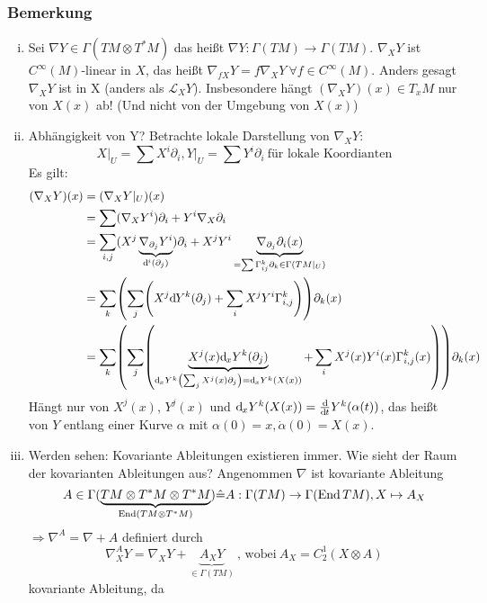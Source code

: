 \subsubsection{Bemerkung}
\label{ssub:29}
\begin{enumerate}[(i)]
\item Sei $\nabla Y\in\Gamma(TM\otimes T^* M)$ das heißt $\nabla Y: \Gamma(TM)\to \Gamma(TM)$. $\nabla_X Y$ ist $C^\infty (M)$-linear in $X$, das heißt $\nabla_{f X} Y = f\nabla_X Y\ \forall f\in C^\infty(M)$. Anders gesagt $\nabla_X Y$ ist  in X (anders als $\mathcal{L}_X Y$). Insbesondere hängt $(\nabla_X Y)(x)\in T_xM$ nur von $X(x)$ ab! (Und nicht von der Umgebung von $X(x)$)
\item Abhängigkeit von Y? Betrachte lokale Darstellung von $\nabla_X Y:$
\[
X\vert_U=\sum X^i\partial_i, Y\vert_U=\sum Y^i\partial_i\ \text{für lokale Koordianten}
\]
Es gilt:
\begin{align*}
\enbrace{\nabla_X Y}(x) &= \enbrace{\nabla_X Y\vert_U}(x)\\
&=\sum \enbrace{\nabla_X Y^i}\partial_i + Y^i\nabla_X \partial_i\\
&=\sum_{i,j}\enbrace{X^j \underbrace{\nabla_{\partial_j} Y^i}_{\mathd ^i(\partial_j)}}\partial_i+ X^j Y^i\underbrace{\nabla_{\partial_j}\partial_i(x)}_{=\sum \Gamma_{ij}^k \partial_k \in \Gamma(TM\vert_U)}\\
&=\sum_k \enbrace*{\sum_j\enbrace*{X^j \mathd Y^k(\partial_j)+\sum_i X^j Y^i \Gamma_{i,j}^k}}\partial_k(x)\\
&=\sum_k \enbrace*{\sum_j \enbrace*{\underbrace{X^j(x) \mathd_x Y^k(\partial_j)}_{\mathd_x Y^k\enbrace*{\sum_j X^j(x) \partial_j} = \mathd_x Y^k(X(x))} + \sum_i X^j(x)Y^i(x)\Gamma_{i,j}^k(x)}}\partial_k(x)
\end{align*}
Hängt nur von $X^j(x)$, $Y^j(x)$ und $\mathrm{d}\mkern-1.0mu_x Y^k(X(x)) = \frac{\mathrm{d}\mkern-1.0mu}{\mathrm{d}\mkern-1.0mu t} Y^k(\alpha(t))$, das heißt von $Y$ entlang einer Kurve $\alpha$ mit $\alpha(0) = x, \dot{\alpha}(0) = X(x)$.
\item Werden sehen: Kovariante Ableitungen existieren immer. Wie sieht der Raum der kovarianten Ableitungen aus? Angenommen $\nabla$ ist kovariante Ableitung 
\[
A\in \Gamma(\underbrace{TM\otimes T^* M\otimes T^* M}_{\operatorname{End}(TM\otimes T^* M)}) \hat{=} A:\Gamma(TM)\to\Gamma(\operatorname{End} TM), X\mapsto A_X
\]
$\Rightarrow \nabla^A=\nabla+A$ definiert durch 
\[
\nabla_X^A Y = \nabla_X Y+\underbrace{A_X Y}_{\in \Gamma(TM)}\ \text{, wobei}\ A_X = C_2^1(X\otimes A)
\]
kovariante Ableitung, da 

\end{enumerate}
